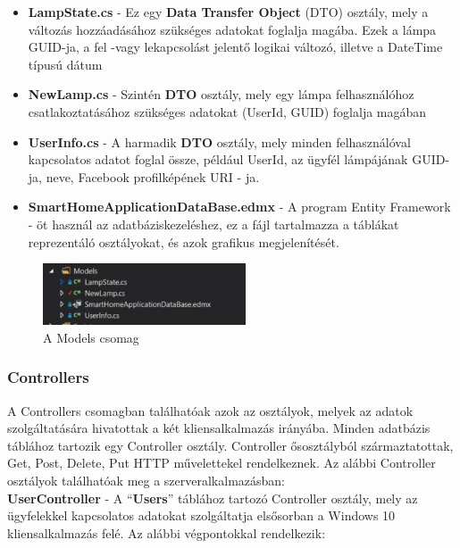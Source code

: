\documentclass[a4paper,12pt]{report}
\begin{document}
\begin{itemize}
    \item \textbf{LampState.cs} - Ez egy \textbf{Data Transfer Object} (DTO) osztály, mely a változás hozzáadásához szükséges
    adatokat foglalja magába. Ezek a lámpa GUID-ja, a fel -vagy lekapcsolást jelentő logikai változó, illetve a DateTime típusú
    dátum
    \item \textbf{NewLamp.cs} - Szintén \textbf{DTO} osztály, mely egy lámpa felhasználóhoz csatlakoztatásához szükséges adatokat
    (UserId, GUID) foglalja magában
    \item \textbf{UserInfo.cs} - A harmadik \textbf{DTO} osztály, mely minden felhasználóval kapcsolatos adatot foglal össze, például
    UserId, az ügyfél lámpájának GUID-ja, neve, Facebook profilképének URI - ja.
    \item \textbf{SmartHomeApplicationDataBase.edmx} - A program Entity Framework - öt használ az adatbáziskezeléshez, ez a fájl
    tartalmazza a táblákat reprezentáló osztályokat, és azok grafikus megjelenítését.
\end{itemize}

\begin{figure}[H]
    \centering
    \includegraphics[width=6cm,keepaspectratio]{images/servicemodels.jpg}
    \caption{A Models csomag}
    \label{fig: ModelsPackage}
\end{figure}

\subsubsection{Controllers}
    A Controllers csomagban találhatóak azok az osztályok, melyek az adatok szolgáltatására hivatottak a két kliensalkalmazás irányába.
    Minden adatbázis táblához tartozik egy Controller osztály. Controller ősosztályból származtatottak, Get, Post, Delete, Put HTTP
    művelettekel rendelkeznek. Az alábbi Controller osztályok találhatóak meg a szerveralkalmazásban:\\

    \textbf{UserController} - A ``\textbf{Users}'' táblához tartozó Controller osztály, mely az ügyfelekkel kapcsolatos adatokat szolgáltatja
    elsősorban a Windows 10 kliensalkalmazás felé. Az alábbi végpontokkal rendelkezik:
\end{document}
